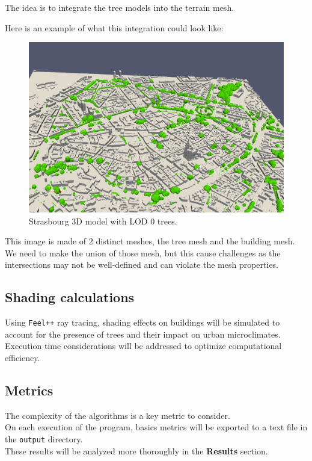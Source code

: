 \documentclass[12pt]{article}
\begin{document}
The idea is to integrate the tree models into the terrain mesh.

Here is an example of what this integration could look like:

\begin{figure}[H]
    \centering
    \includegraphics[width=1\textwidth]{images/stras_lod0.png}
    \caption{Strasbourg 3D model with LOD 0 trees.}
\end{figure}

This image is made of 2 distinct meshes, the tree mesh and the building mesh.
We need to make the union of those mesh, but this cause challenges as the intersections
may not be well-defined and can violate the mesh properties.


\subsection{Shading calculations}
Using \texttt{Feel++} ray tracing, shading effects on buildings will be simulated to account for the presence
of trees and their impact on urban microclimates. Execution time considerations will be
addressed to optimize computational efficiency.

\subsection{Metrics}
The complexity of the algorithms is a key metric to consider. \\
On each execution of the program, basics metrics will be exported to a text file in
the \texttt{output} directory. \\
These results will be analyzed more thoroughly in the \textbf{Results} section.
\end{document}
